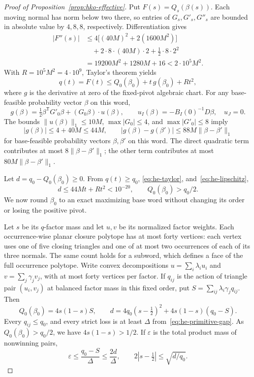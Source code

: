 \begin{proof}[Proof of Proposition~\ref{prop:hko-effective}]
Put $F(s)=Q_s(\beta(s))$. Each moving normal has norm below two there,
so entries of $G_s,G'_s,G''_s$ are bounded in absolute value by
$4,8,8$, respectively. Differentiation gives
\[
\begin{aligned}
 |F''(s)|
 &\leq4\bigl[(40M)^2+2(1600M^2)\bigr]\\
 &\quad+2\cdot8\cdot(40M)\cdot2+\tfrac12\cdot8\cdot2^2\\
 &=19200M^2+1280M+16<2\cdot10^5M^2.
\end{aligned}
\]
With $R=10^5M^2=4\cdot10^9$, Taylor's theorem yields
\begin{equation}\label{eq:he-taylor}
 q(t)=F(t)\leq Q_0(\beta_0)+t\,g(\beta_0)+Rt^2,
\end{equation}
where $g$ is the derivative at zero of the fixed-pivot algebraic
chart. For any base-feasible probability vector $\beta$ on this word,
\[
 g(\beta)=\tfrac12\beta^{\mathsf T}G'_0\beta
                 +(G_0\beta)\cdot u(\beta),\qquad
 u_I(\beta)=-B_I(0)^{-1}D\beta,\quad u_J=0.
\]
The bounds $\|u(\beta)\|_1\leq10M$,
$\max|G_0|\leq4$, and $\max|G'_0|\leq8$ imply
\begin{equation}\label{eq:he-lipschitz}
 |g(\beta)|\leq4+40M\leq44M,\qquad
 |g(\beta)-g(\beta')|\leq88M\|\beta-\beta'\|_1
\end{equation}
for base-feasible probability vectors $\beta,\beta'$ on this word.
The direct quadratic term contributes at most $8\|\beta-\beta'\|_1$;
the other term contributes at most $80M\|\beta-\beta'\|_1$.

Let $d=q_0-Q_0(\beta_0)\geq0$. From $q(t)\geq q_0$,
\eqref{eq:he-taylor}, and~\eqref{eq:he-lipschitz},
\begin{equation}\label{eq:he-small-deficit}
 d\leq44Mt+Rt^2<10^{-20},
 \qquad Q_0(\beta_0)>q_0/2.
\end{equation}
We now round $\beta_0$ to an exact maximizing base word without
changing its order or losing the positive pivot.

Let $s$ be its $q$-factor mass and let $u,v$ be its normalized
factor weights. Each occurrence-wise planar closure polytope has at
most forty vertices: each vertex uses one of five closing triangles
and one of at most two occurrences of each of its three normals.
The same count holds for a subword, which defines a face of the
full occurrence polytope. Write convex decompositions
$u=\sum_i\lambda_i u_i$ and $v=\sum_j\gamma_jv_j$, with at most forty
vertices per factor. If $q_{ij}$ is the action of triangle pair
$(u_i,v_j)$ at balanced factor mass in this fixed order, put
$S=\sum_{ij}\lambda_i\gamma_jq_{ij}$. Then
\begin{equation}\label{eq:he-deficit}
 Q_0(\beta_0)=4s(1-s)S,\qquad
 d=4q_0(s-\tfrac12)^2+4s(1-s)(q_0-S).
\end{equation}
Every $q_{ij}\leq q_0$, and every strict loss is at least
$\Delta$ from~\eqref{eq:he-primitive-gap}. As
$Q_0(\beta_0)>q_0/2$, we have $4s(1-s)>1/2$.
If $\varepsilon$ is the total product mass of nonwinning pairs,
\begin{equation}\label{eq:he-bad-mass}
 \varepsilon\leq\frac{q_0-S}{\Delta}\leq\frac{2d}{\Delta},
 \qquad 2|s-\tfrac12|\leq\sqrt{d/q_0}.
\end{equation}


\end{proof}
